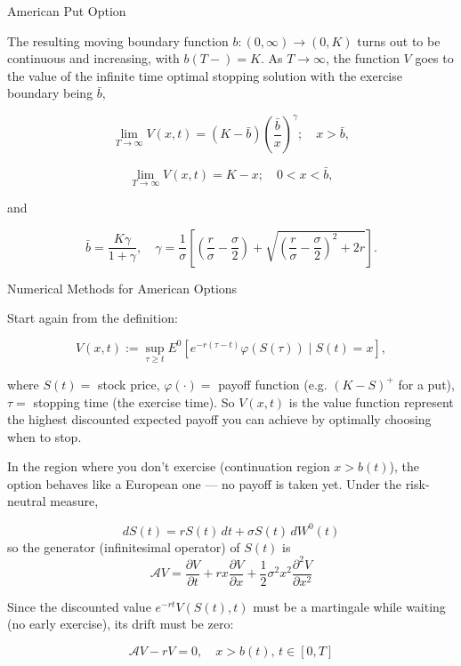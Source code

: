 \documentclass{beamer}
\begin{document}
\begin{frame}{American Put Option}

    {\footnotesize \footnotesize
    The resulting moving boundary function \( b : (0, \infty) \to (0, K) \) turns out to be continuous and increasing, with \( b(T - ) = K \). As \( T \to \infty \), the function \( V \) goes to the value of the infinite time optimal stopping solution with the exercise boundary being \( \bar{b} \),

    \[
    \lim_{T \to \infty} V(x, t) = (K - \bar{b}) \left( \frac{\bar{b}}{x} \right)^\gamma; \quad x > \bar{b},
    \]

    \[
    \lim_{T \to \infty} V(x, t) = K - x; \quad 0 < x < \bar{b},
    \]

    and

    \[
    \bar{b} = \frac{K \gamma}{1 + \gamma}, \quad \gamma = \frac{1}{\sigma} \left[ \left( \frac{r}{\sigma} - \frac{\sigma}{2} \right) + \sqrt{\left( \frac{r}{\sigma} - \frac{\sigma}{2} \right)^2 + 2r} \right].
    \]
    }
\end{frame} 

\begin{frame}{Numerical Methods for American Options}

    {\footnotesize \footnotesize
     Start again from the definition:

    \[
    V(x,t) := \sup_{\tau \geq t} E^0 \left[ e^{-r(\tau - t)} \varphi(S(\tau)) \mid S(t) = x \right],
    \]

    where \( S(t) = \) stock price, \(\varphi(\cdot) = \) payoff function (e.g. \((K - S)^+\) for 
    a put), \(\tau = \) stopping time (the exercise time). So \( V(x,t) \) is the value function
    represent the highest discounted expected payoff you can achieve by optimally choosing when to stop.
    \vspace{1em}
    
     \pause In the region where you don't exercise (continuation region \(x > b(t)\)), 
    the option behaves like a European one — no payoff is taken yet. Under the risk-neutral measure,
    
    \[
    dS(t) = rS(t) \, dt + \sigma S(t) \, dW^0(t)
    \]
    so the generator (infinitesimal operator) of \(S(t)\) is 
    \[
    \mathcal{A} V = \frac{\partial V}{\partial t} + rx \frac{\partial V}{\partial x} + 
    \frac{1}{2} \sigma^2 x^2 \frac{\partial^2 V}{\partial x^2}
    \]

    Since the discounted value \(e^{-rt} V(S(t), t)\) must be 
    a martingale while waiting (no early exercise), its drift must be zero:

    \[
    \mathcal{A} V - rV = 0, \quad x > b(t), \, t \in [0, T]
    \]
    }
\end{frame} 
\end{document}
